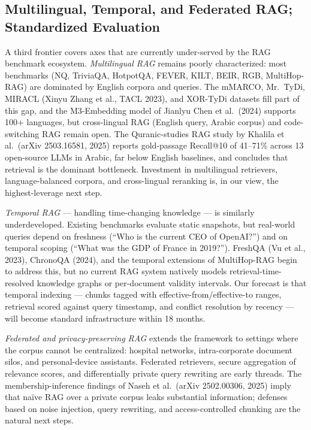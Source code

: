 \subsection{Multilingual, Temporal, and Federated RAG; Standardized Evaluation}\label{multilingual-temporal-and-federated-rag-standardized-evaluation}

A third frontier covers axes that are currently under-served by the RAG benchmark ecosystem. \emph{Multilingual RAG} remains poorly characterized: most benchmarks (NQ, TriviaQA, HotpotQA, FEVER, KILT, BEIR, RGB, MultiHop-RAG) are dominated by English corpora and queries. The mMARCO, Mr.~TyDi, MIRACL (Xinyu Zhang et al., TACL 2023), and XOR-TyDi datasets fill part of this gap, and the M3-Embedding model of Jianlyu Chen et al.~(2024) supports 100+ languages, but cross-lingual RAG (English query, Arabic corpus) and code-switching RAG remain open. The Quranic-studies RAG study by Khalila et al.~(arXiv 2503.16581, 2025) reports gold-passage Recall@10 of 41--71\% across 13 open-source LLMs in Arabic, far below English baselines, and concludes that retrieval is the dominant bottleneck. Investment in multilingual retrievers, language-balanced corpora, and cross-lingual reranking is, in our view, the highest-leverage next step.

\emph{Temporal RAG} --- handling time-changing knowledge --- is similarly underdeveloped. Existing benchmarks evaluate static snapshots, but real-world queries depend on freshness (``Who is the current CEO of OpenAI?'') and on temporal scoping (``What was the GDP of France in 2019?''). FreshQA (Vu et al., 2023), ChronoQA (2024), and the temporal extensions of MultiHop-RAG begin to address this, but no current RAG system natively models retrieval-time-resolved knowledge graphs or per-document validity intervals. Our forecast is that temporal indexing --- chunks tagged with effective-from/effective-to ranges, retrieval scored against query timestamp, and conflict resolution by recency --- will become standard infrastructure within 18 months.

\emph{Federated and privacy-preserving RAG} extends the framework to settings where the corpus cannot be centralized: hospital networks, intra-corporate document silos, and personal-device assistants. Federated retrievers, secure aggregation of relevance scores, and differentially private query rewriting are early threads. The membership-inference findings of Naseh et al.~(arXiv 2502.00306, 2025) imply that naïve RAG over a private corpus leaks substantial information; defenses based on noise injection, query rewriting, and access-controlled chunking are the natural next steps.

